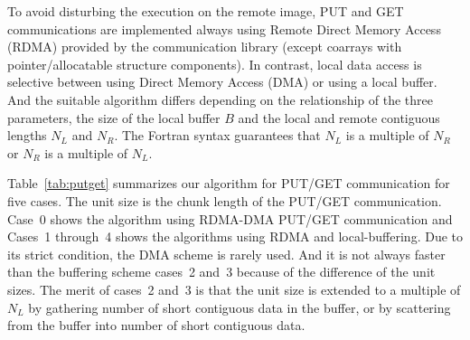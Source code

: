 To avoid disturbing the execution on the remote image, PUT and GET communications
are implemented always using Remote Direct Memory Access (RDMA) provided by 
the communication library (except coarrays with pointer/allocatable structure components). 
In contrast, local data access is selective between using Direct Memory Access (DMA) or
using a local buffer. And the suitable algorithm differs depending on the 
relationship of the three parameters, the size of the local buffer $B$ and the 
local and remote contiguous lengths $N_L$ and $N_R$.
The Fortran syntax guarantees that $N_L$ is a multiple of $N_R$ or $N_R$ is a multiple of $N_L$.

Table~\ref{tab:putget} summarizes our algorithm for PUT/GET communication for five cases.
The unit size is the chunk length of the PUT/GET communication.
Case~0 shows the algorithm using RDMA-DMA PUT/GET communication and Cases~1 through~4
shows the algorithms using RDMA and local-buffering. 
Due to its strict condition, the DMA scheme is rarely used.
And it is not always faster than the buffering scheme cases~2 and~3 because of the 
difference of the unit sizes. The merit of cases~2 and~3 is that the unit size 
is extended to a multiple of $N_L$ by gathering number of short contiguous data in the buffer,
or by scattering from the buffer into number of short contiguous data.

